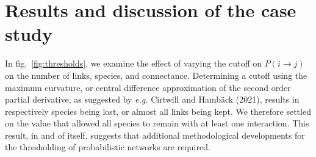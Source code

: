 \documentclass[10pt,oneside]{article}
\begin{document}
\hypertarget{results-and-discussion-of-the-case-study}{%
\section{Results and discussion of the case
study}\label{results-and-discussion-of-the-case-study}}

In fig.~\ref{fig:thresholds}, we examine the effect of varying the
cutoff on \(P(i \rightarrow j)\) on the number of links, species, and
connectance. Determining a cutoff using the maximum curvature, or
central difference approximation of the second order partial derivative,
as suggested by \emph{e.g.} Cirtwill and Hambäck (2021), results in
respectively species being lost, or almost all links being kept. We
therefore settled on the value that allowed all species to remain with
at least one interaction. This result, in and of itself, suggests that
additional methodological developments for the thresholding of
probabilistic networks are required.
\end{document}
